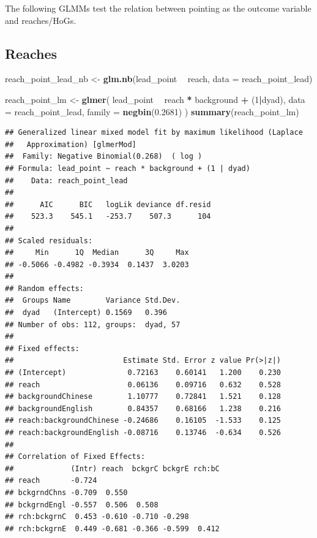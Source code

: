 \documentclass[]{article}
\newenvironment{Shaded}{\begin{snugshade}}{\end{snugshade}}
\newcommand{\DataTypeTok}[1]{\textcolor[rgb]{0.13,0.29,0.53}{#1}}
\newcommand{\DecValTok}[1]{\textcolor[rgb]{0.00,0.00,0.81}{#1}}
\newcommand{\FloatTok}[1]{\textcolor[rgb]{0.00,0.00,0.81}{#1}}
\newcommand{\KeywordTok}[1]{\textcolor[rgb]{0.13,0.29,0.53}{\textbf{#1}}}
\newcommand{\NormalTok}[1]{#1}
\newcommand{\OperatorTok}[1]{\textcolor[rgb]{0.81,0.36,0.00}{\textbf{#1}}}
\newcommand{\StringTok}[1]{\textcolor[rgb]{0.31,0.60,0.02}{#1}}
\begin{document}
The following GLMMs test the relation between pointing as the outcome
variable and reaches/HoGs.

\hypertarget{reaches}{%
\subsection{Reaches}\label{reaches}}

\begin{Shaded}
\begin{Highlighting}[]
\NormalTok{reach_point_lead_nb <-}\StringTok{ }\KeywordTok{glm.nb}\NormalTok{(lead_point }\OperatorTok{~}\StringTok{ }\NormalTok{reach, }\DataTypeTok{data =}\NormalTok{ reach_point_lead)}

\NormalTok{reach_point_lm <-}\StringTok{ }\KeywordTok{glmer}\NormalTok{(}
\NormalTok{  lead_point }\OperatorTok{~}
\StringTok{    }\NormalTok{reach }\OperatorTok{*}
\StringTok{    }\NormalTok{background }\OperatorTok{+}
\StringTok{    }\NormalTok{(}\DecValTok{1}\OperatorTok{|}\NormalTok{dyad),}
  \DataTypeTok{data =}\NormalTok{ reach_point_lead,}
  \DataTypeTok{family =} \KeywordTok{negbin}\NormalTok{(}\FloatTok{0.2681}\NormalTok{)}
\NormalTok{)}
\KeywordTok{summary}\NormalTok{(reach_point_lm)}
\end{Highlighting}
\end{Shaded}

\begin{verbatim}
## Generalized linear mixed model fit by maximum likelihood (Laplace
##   Approximation) [glmerMod]
##  Family: Negative Binomial(0.268)  ( log )
## Formula: lead_point ~ reach * background + (1 | dyad)
##    Data: reach_point_lead
## 
##      AIC      BIC   logLik deviance df.resid 
##    523.3    545.1   -253.7    507.3      104 
## 
## Scaled residuals: 
##     Min      1Q  Median      3Q     Max 
## -0.5066 -0.4982 -0.3934  0.1437  3.0203 
## 
## Random effects:
##  Groups Name        Variance Std.Dev.
##  dyad   (Intercept) 0.1569   0.396   
## Number of obs: 112, groups:  dyad, 57
## 
## Fixed effects:
##                         Estimate Std. Error z value Pr(>|z|)
## (Intercept)              0.72163    0.60141   1.200    0.230
## reach                    0.06136    0.09716   0.632    0.528
## backgroundChinese        1.10777    0.72841   1.521    0.128
## backgroundEnglish        0.84357    0.68166   1.238    0.216
## reach:backgroundChinese -0.24686    0.16105  -1.533    0.125
## reach:backgroundEnglish -0.08716    0.13746  -0.634    0.526
## 
## Correlation of Fixed Effects:
##             (Intr) reach  bckgrC bckgrE rch:bC
## reach       -0.724                            
## bckgrndChns -0.709  0.550                     
## bckgrndEngl -0.557  0.506  0.508              
## rch:bckgrnC  0.453 -0.610 -0.710 -0.298       
## rch:bckgrnE  0.449 -0.681 -0.366 -0.599  0.412
\end{verbatim}
\end{document}
